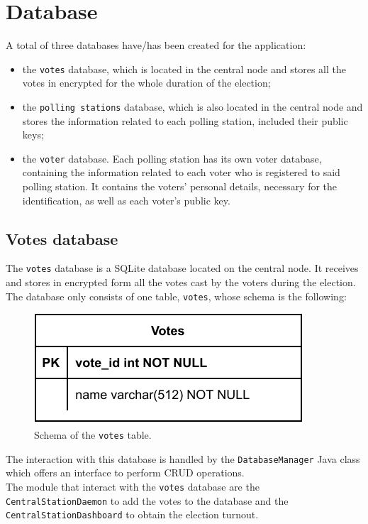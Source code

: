 %
\chapter{Database}\label{ch:database}
A total of three databases have/has been created for the application:
\begin{itemize}
	\item the \texttt{votes} database, which is located in the central node and stores all the votes in encrypted for the whole duration of the election;
	\item the \texttt{polling stations} database, which is also located in the central node and stores the information related to each polling station, included their public keys;
	\item the \texttt{voter} database. Each polling station has its own voter database, containing the information related to each voter who is registered to said polling station. It contains the voters' personal details, necessary for the identification, as well as each voter's public key.
\end{itemize}

\section{Votes database}\label{sec:votes_db}
The \texttt{votes} database is a SQLite database located on the central node. It receives and stores in encrypted form all the votes cast by the voters during the election.\\
The database only consists of one table, \texttt{votes}, whose schema is the following:\\
\begin{figure}[H]
    \begin{center}
        \includegraphics[scale=1]{img/votes_schema.pdf}
    \end{center}
    \vspace*{-0.5cm}
    \caption{Schema of the \texttt{votes} table.}
    \label{fig:votes_schema}
\end{figure}
The interaction with this database is handled by the \texttt{DatabaseManager} Java class which offers an interface to perform CRUD operations.\\
The module that interact with the \texttt{votes} database are the \texttt{CentralStationDaemon} to add the votes to the database and the \texttt{CentralStationDashboard} to obtain the election turnout.

